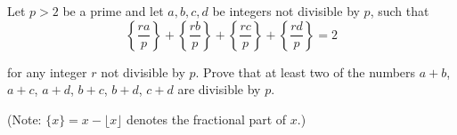 Let $p > 2$ be a prime and let $a,b,c,d$ be integers not divisible by $p$,  such that\[ \left\{ \dfrac{ra}{p} \right\} + \left\{ \dfrac{rb}{p} \right\} + \left\{ \dfrac{rc}{p} \right\} + \left\{ \dfrac{rd}{p} \right\} = 2  \]

for any integer $r$ not divisible by $p$. Prove that at least two of the numbers $a+b$,  $a+c$,  $a+d$,  $b+c$,  $b+d$,  $c+d$ are divisible by $p$.

(Note: $\{x\} = x - \lfloor x \rfloor$ denotes the fractional part of $x$.)
